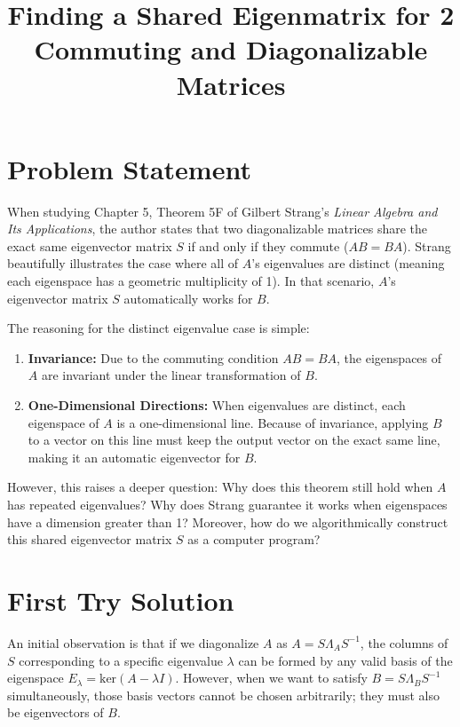 \documentclass{article}
\begin{document}
\title{Finding a Shared Eigenmatrix for 2 Commuting and Diagonalizable Matrices}
\author{}
\date{}
\maketitle

\section{Problem Statement}
When studying Chapter 5, Theorem 5F of Gilbert Strang's \textit{Linear Algebra and Its Applications}, the author states that two diagonalizable matrices share the exact same eigenvector matrix $S$ if and only if they commute ($AB = BA$). Strang beautifully illustrates the case where all of $A$'s eigenvalues are distinct (meaning each eigenspace has a geometric multiplicity of 1). In that scenario, $A$'s eigenvector matrix $S$ automatically works for $B$.

The reasoning for the distinct eigenvalue case is simple:
\begin{enumerate}
    \item \textbf{Invariance:} Due to the commuting condition $AB = BA$, the eigenspaces of $A$ are invariant under the linear transformation of $B$.
    \item \textbf{One-Dimensional Directions:} When eigenvalues are distinct, each eigenspace of $A$ is a one-dimensional line. Because of invariance, applying $B$ to a vector on this line must keep the output vector on the exact same line, making it an automatic eigenvector for $B$.
\end{enumerate}

However, this raises a deeper question: Why does this theorem still hold when $A$ has repeated eigenvalues? Why does Strang guarantee it works when eigenspaces have a dimension greater than 1? Moreover, how do we algorithmically construct this shared eigenvector matrix $S$ as a computer program?

\section{First Try Solution}
An initial observation is that if we diagonalize $A$ as $A = S \Lambda_A S^{-1}$, the columns of $S$ corresponding to a specific eigenvalue $\lambda$ can be formed by any valid basis of the eigenspace $E_\lambda = \text{ker}(A - \lambda I)$. However, when we want to satisfy $B = S \Lambda_B S^{-1}$ simultaneously, those basis vectors cannot be chosen arbitrarily; they must also be eigenvectors of $B$.
\end{document}
